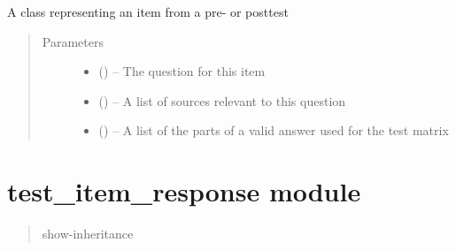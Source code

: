 \documentclass[letterpaper,10pt,english]{sphinxmanual}
\begin{document}
\begin{fulllineitems}
\label{\detokenize{test_item:test_item.TestItem}}
A class representing an item from a pre- or posttest
\begin{quote}\begin{description}
\item[{Parameters}] \leavevmode\begin{itemize}
\item {} 
 () -- The question for this item

\item {} 
 (\sphinxstyleliteralemphasis{(}\sphinxstyleliteralemphasis{)}\sphinxstyleliteralemphasis{}) -- A list of sources relevant to this question

\item {} 
 (\sphinxstyleliteralemphasis{(}\sphinxstyleliteralemphasis{)}\sphinxstyleliteralemphasis{}) -- A list of the parts of a valid answer used for the test matrix

\end{itemize}

\end{description}\end{quote}

\end{fulllineitems}



\chapter{test\_item\_response module}
\label{\detokenize{test_item_response:test-item-response-module}}\label{\detokenize{test_item_response::doc}}\label{\detokenize{test_item_response:module-test_item_response}}\begin{quote}\begin{description}
\item[{show-inheritance}] \leavevmode
\end{description}\end{quote}
\end{document}
